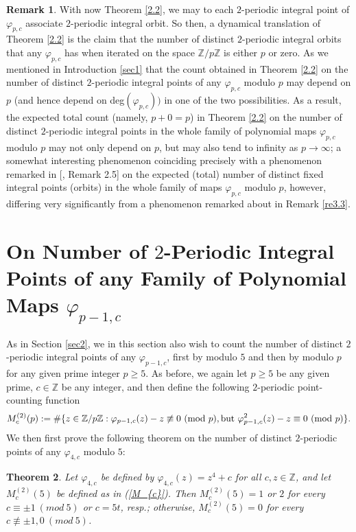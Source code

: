 \documentclass{article}
\theoremstyle{plain}
\newtheorem{thm}{Theorem}[section]
\theoremstyle{definition}
\newtheorem{rem}[thm]{Remark}
\begin{document}
\begin{rem}\label{rem2.3}
With now Theorem \ref{2.2}, we may to each $2$-periodic integral point of $\varphi_{p,c}$ associate $2$-periodic integral orbit. So then, a dynamical translation of Theorem \ref{2.2} is the claim that the number of distinct $2$-periodic integral orbits that any $\varphi_{p,c}$ has when iterated on the space $\mathbb{Z} / p\mathbb{Z}$ is either $p$ or zero. As we mentioned in Introduction \ref{sec1} that the count obtained in Theorem \ref{2.2} on the number of distinct $2$-periodic integral points of any $\varphi_{p,c}$ modulo $p$ may depend on $p$ (and hence depend on deg$(\varphi_{p,c}))$ in one of the two possibilities. As a result, the expected total count (namely, $p+0 =p$) in Theorem \ref{2.2} on the number of distinct $2$-periodic integral points in the whole family of polynomial maps $\varphi_{p,c}$ modulo $p$ may not only depend on $p$, but may also tend to infinity as $p\to \infty$; a somewhat interesting phenomenon coinciding precisely with a phenomenon remarked in [\cite{BK3}, Remark 2.5] on the expected (total) number of distinct fixed integral points (orbits) in the whole family of maps $\varphi_{p,c}$ modulo $p$, however, differing very significantly from a phenomenon remarked about in Remark \ref{re3.3}.
\end{rem}

\section{On Number of $2$-Periodic Integral Points of any Family of Polynomial Maps $\varphi_{p-1,c}$}\label{sec3}

As in Section \ref{sec2}, we in this section also wish to count the number of distinct $2$-periodic integral points of any $\varphi_{p-1,c}$, first by modulo $5$ and then by modulo $p$ for any given prime integer $p\geq 5$. As before, we again let $p\geq 5$ be any given prime, $c\in \mathbb{Z}$ be any integer, and then define the following $2$-periodic point-counting function 
\begin{equation}\label{M_{c}}
M_{c}^{(2)}(p) := \#\{ z\in \mathbb{Z} / p\mathbb{Z} :\varphi_{p-1,c}(z) -z \not \equiv 0 \ \text{(mod $p$)}, \text{but} \ \varphi_{p-1,c}^2(z) - z \equiv 0 \ \text{(mod $p$)}\}.
\end{equation}\noindent We then first prove the following theorem on the number of distinct $2$-periodic points of any $\varphi_{4, c}$ modulo $5$:
\begin{thm} \label{3.1}
Let $\varphi_{4, c}$ be defined by $\varphi_{4, c}(z) = z^4 + c$ for all $c, z\in\mathbb{Z}$, and let $M_{c}^{(2)}(5)$ be defined as in \textnormal{(\ref{M_{c}})}. Then $M_{c}^{(2)}(5) = 1$ or $2$ for every $c\equiv \pm1 \ (mod \ 5)$ or $c = 5t$, resp.; otherwise, $M_{c}^{(2)}(5) = 0$ for every $c\not \equiv \pm1, 0\ (mod \ 5)$. 
\end{thm}
\end{document}

